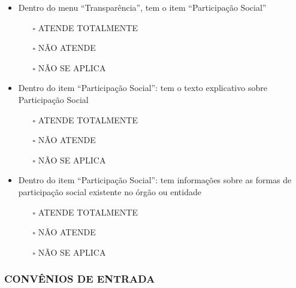 \documentclass[
]{book}
\providecommand{\tightlist}{%
  \setlength{\itemsep}{0pt}\setlength{\parskip}{0pt}}
\begin{document}
\begin{itemize}
\tightlist
\item
  Dentro do menu ``Transparência'', tem o item ``Participação Social''

  \begin{itemize}
  \tightlist
  \item[$\square$]
    ATENDE TOTALMENTE
  \item[$\square$]
    NÃO ATENDE
  \item[$\square$]
    NÃO SE APLICA
  \end{itemize}
\item
  Dentro do item ``Participação Social'': tem o texto explicativo sobre Participação Social

  \begin{itemize}
  \tightlist
  \item[$\square$]
    ATENDE TOTALMENTE
  \item[$\square$]
    NÃO ATENDE
  \item[$\square$]
    NÃO SE APLICA
  \end{itemize}
\item
  Dentro do item ``Participação Social'': tem informações sobre as formas de participação social existente no órgão ou entidade

  \begin{itemize}
  \tightlist
  \item[$\square$]
    ATENDE TOTALMENTE
  \item[$\square$]
    NÃO ATENDE
  \item[$\square$]
    NÃO SE APLICA
  \end{itemize}
\end{itemize}

\hypertarget{convuxeanios-de-entrada-1}{%
\subsubsection*{CONVÊNIOS DE ENTRADA}\label{convuxeanios-de-entrada-1}}
\end{document}
